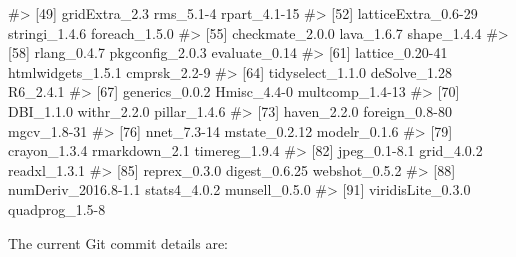 \documentclass[
]{jss}
\begin{document}
\begin{CodeChunk}
\begin{CodeOutput}
#> [49] gridExtra_2.3       rms_5.1-4           rpart_4.1-15       
#> [52] latticeExtra_0.6-29 stringi_1.4.6       foreach_1.5.0      
#> [55] checkmate_2.0.0     lava_1.6.7          shape_1.4.4        
#> [58] rlang_0.4.7         pkgconfig_2.0.3     evaluate_0.14      
#> [61] lattice_0.20-41     htmlwidgets_1.5.1   cmprsk_2.2-9       
#> [64] tidyselect_1.1.0    deSolve_1.28        R6_2.4.1           
#> [67] generics_0.0.2      Hmisc_4.4-0         multcomp_1.4-13    
#> [70] DBI_1.1.0           withr_2.2.0         pillar_1.4.6       
#> [73] haven_2.2.0         foreign_0.8-80      mgcv_1.8-31        
#> [76] nnet_7.3-14         mstate_0.2.12       modelr_0.1.6       
#> [79] crayon_1.3.4        rmarkdown_2.1       timereg_1.9.4      
#> [82] jpeg_0.1-8.1        grid_4.0.2          readxl_1.3.1       
#> [85] reprex_0.3.0        digest_0.6.25       webshot_0.5.2      
#> [88] numDeriv_2016.8-1.1 stats4_4.0.2        munsell_0.5.0      
#> [91] viridisLite_0.3.0   quadprog_1.5-8
\end{CodeOutput}
\end{CodeChunk}

The current Git commit details are:

\begin{CodeChunk}

\end{CodeChunk}


\end{document}
